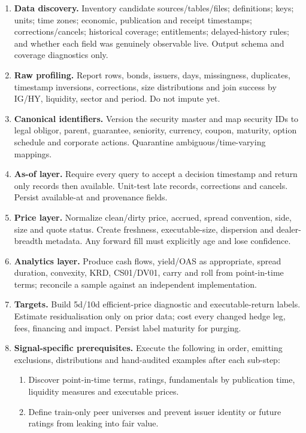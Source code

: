 \documentclass[10pt]{article}
\begin{document}
\begin{enumerate}[leftmargin=2em,label=\textbf{A\arabic*.}]
\item \textbf{Data discovery.} Inventory candidate sources/tables/files; definitions; keys; units; time zones; economic, publication and receipt timestamps; corrections/cancels; historical coverage; entitlements; delayed-history rules; and whether each field was genuinely observable live. Output schema and coverage diagnostics only.
\item \textbf{Raw profiling.} Report rows, bonds, issuers, days, missingness, duplicates, timestamp inversions, corrections, size distributions and join success by IG/HY, liquidity, sector and period. Do not impute yet.
\item \textbf{Canonical identifiers.} Version the security master and map security IDs to legal obligor, parent, guarantee, seniority, currency, coupon, maturity, option schedule and corporate actions. Quarantine ambiguous/time-varying mappings.
\item \textbf{As-of layer.} Require every query to accept a decision timestamp and return only records then available. Unit-test late records, corrections and cancels. Persist available-at and provenance fields.
\item \textbf{Price layer.} Normalize clean/dirty price, accrued, spread convention, side, size and quote status. Create freshness, executable-size, dispersion and dealer-breadth metadata. Any forward fill must explicitly age and lose confidence.
\item \textbf{Analytics layer.} Produce cash flows, yield/OAS as appropriate, spread duration, convexity, KRD, CS01/DV01, carry and roll from point-in-time terms; reconcile a sample against an independent implementation.
\item \textbf{Targets.} Build 5d/10d efficient-price diagnostic and executable-return labels. Estimate residualisation only on prior data; cost every changed hedge leg, fees, financing and impact. Persist label maturity for purging.
\item \textbf{Signal-specific prerequisites.} Execute the following in order, emitting exclusions, distributions and hand-audited examples after each sub-step:
\begin{enumerate}[label=\alph*)]
\item Discover point-in-time terms, ratings, fundamentals by publication time, liquidity measures and executable prices.
\item Define train-only peer universes and prevent issuer identity or future ratings from leaking into fair value.

\end{enumerate}
\end{enumerate}
\end{document}
